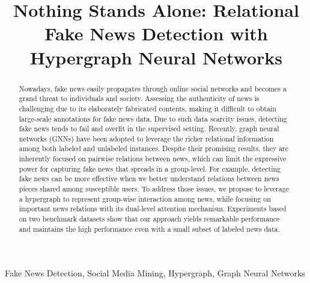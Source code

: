 \documentclass[conference]{IEEEtran}
\begin{document}
\title{Nothing Stands Alone: Relational Fake News Detection with Hypergraph Neural Networks}

\author{
}


\maketitle

\begin{abstract} Nowadays, fake news easily propagates through online social networks and becomes a grand threat to individuals and society. Assessing the authenticity of news is challenging due to its elaborately fabricated contents, making it difficult to obtain large-scale annotations for fake news data. Due to such data scarcity issues, detecting fake news tends to fail and overfit in the supervised setting. Recently, graph neural networks (GNNs) have been adopted to leverage the richer relational information among both labeled and unlabeled instances. Despite their promising results, they are inherently focused on pairwise relations between news, which can limit the expressive power for capturing fake news that spreads in a group-level. For example, detecting fake news can be more effective when we better understand relations between news pieces shared among susceptible users. To address those issues, we propose to leverage a hypergraph to represent group-wise interaction among news, while focusing on important news relations with its dual-level attention mechanism. Experiments based on two benchmark datasets show that our approach yields remarkable performance and maintains the high performance even with a small subset of labeled news data.
\end{abstract}
\begin{IEEEkeywords}
Fake News Detection, Social Media Mining, Hypergraph, Graph Neural Networks
\end{IEEEkeywords}
\end{document}
